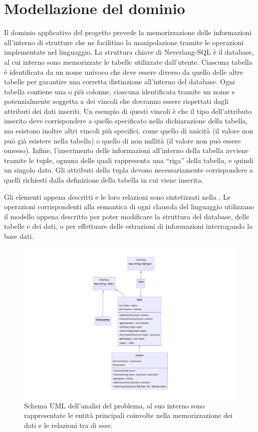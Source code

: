 \documentclass[12pt,a4paper,openright,twoside]{book}
\begin{document}
\section{Modellazione del dominio}
Il dominio applicativo del progetto prevede la memorizzazione delle informazioni all’interno di strutture che ne facilitino la manipolazione 
tramite le operazioni implementate nel linguaggio. La struttura chiave di Neverlang-SQL è il database, al cui interno sono memorizzate le 
tabelle utilizzate dall’utente. Ciascuna tabella è identificata da un nome univoco che deve essere diverso da quello delle altre tabelle 
per garantire una corretta distinzione all’interno del database. Ogni tabella contiene una o più colonne, ciascuna identificata tramite un 
nome e potenzialmente soggetta a dei vincoli che dovranno essere rispettati dagli attributi dei dati inseriti. Un esempio di questi vincoli 
è che il tipo dell’attributo inserito deve corrispondere a quello specificato nella dichiarazione della tabella, ma esistono inoltre altri 
vincoli più specifici, come quello di unicità (il valore non può già esistere nella tabella) o quello di non nullità (il valore non può 
essere omesso). Infine, l’inserimento delle informazioni all’interno della tabella avviene tramite le tuple, ognuna delle quali rappresenta 
una ``riga'' della tabella, e quindi un singolo dato. Gli attributi della tupla devono necessariamente corrispondere a quelli richiesti 
dalla definizione della tabella in cui viene inserita.

Gli elementi appena descritti e le loro relazioni sono sintetizzati nella . Le operazioni corrispondenti alla 
semantica di ogni clausola del linguaggio utilizzano il modello appena descritto per poter modificare la struttura del database, delle 
tabelle e dei dati, o per effettuare delle estrazioni di informazioni interrogando la base dati.

\begin{figure}
    \centering
    \includegraphics[width=.6\linewidth]{figures/model-diagram.pdf}
    \caption{Schema UML dell'analisi del problema, al suo interno sono rappresentate le entità principali coinvolte nella memorizzazione 
            dei dati e le relazioni tra di esse.}
    \label{fig:model-diagram}
\end{figure}
\end{document}
